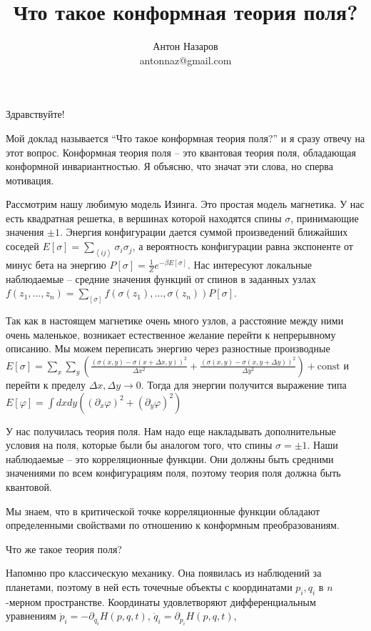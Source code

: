 \documentclass[a4paper,12pt]{article}
\title{Что такое конформная теория поля?}
\author{Антон Назаров\\ antonnaz@gmail.com}
\theoremstyle{definition}
\begin{document}
\maketitle

Здравствуйте!

Мой доклад называется ``Что такое конформная теория поля?'' и я сразу
отвечу на этот вопрос. Конформная теория поля -- это квантовая теория
поля, обладающая конформной инвариантностью.  Я объясню, что значат
эти слова, но сперва мотивация. 

Рассмотрим нашу любимую модель Изинга. Это простая модель магнетика.
У нас есть квадратная решетка, в вершинах которой находятся спины
$\sigma$, принимающие значения $\pm 1$. Энергия конфигурации дается
суммой произведений ближайших соседей
$E[\sigma]=\sum_{\left<ij\right>} \sigma_i \sigma_j$, а вероятность
конфигурации равна экспоненте от минус бета на энергию
$P[\sigma]=\frac{1}{Z}e^{-\beta E[\sigma]}$. Нас интересуют локальные 
наблюдаемые -- средние значения функций от спинов в заданных узлах
$f(z_1,\dots,z_n)=\sum_{[\sigma]} f(\sigma(z_1),\dots,\sigma(z_n))
P[\sigma]$.

Так как в настоящем магнетике очень много узлов, а расстояние между
ними очень маленькое, возникает естественное желание перейти к
непрерывному описанию. Мы можем переписать энергию через разностные производные
$E[\sigma]=\sum_x \sum_y \left( \frac{(\sigma(x,y)-\sigma(x+\Delta
    x,y))^2}{\Delta x^2} + \frac{(\sigma(x,y)-\sigma(x,y+\Delta
    y))^2}{\Delta y^2}\right) +\mathrm{const}$
и перейти к пределу $\Delta x, \Delta y\to 0$. Тогда для энергии
получится выражение типа 
$E[\varphi]=\int dx dy \left( (\partial_x \varphi)^2+(\partial_y
  \varphi)^2\right)$

У нас получилась теория поля. Нам надо еще накладывать дополнительные
условия на поля, которые были бы аналогом того, что спины $\sigma=\pm
1$.  Наши наблюдаемые -- это корреляционные функции. Они должны быть
средними значениями по всем конфигурациям поля, поэтому теория поля
должна быть квантовой.  

Мы знаем, что в критической точке корреляционные функции обладают
определенными свойствами по отношению к конформным преобразованиям. 

Что же такое теория поля?

Напомню про классическую механику. Она появилась из наблюдений за
планетами, поэтому в ней есть точечные объекты с координатами
$p_i, q_i$  в $n$-мерном пространстве. Координаты удовлетворяют
дифференциальным уравнениям 
$\dot p_i = -\partial_{q_i} H(p,q,t)$, $\dot q_i = \partial_{p_i}
H(p,q,t)$, 
\end{document}
